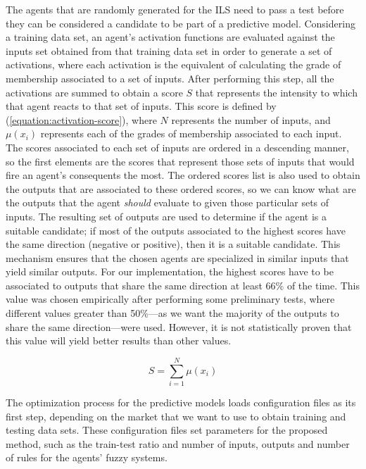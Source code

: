 ﻿\documentclass{ieeeaccess}
\begin{document}
The agents that are randomly generated for the ILS need to
pass a test before they can be considered a candidate to be part of a
predictive model. Considering a training data set, an agent's
activation functions are evaluated against the inputs set obtained
from that training data set in order to generate a set of activations,
where each activation is the equivalent of calculating the grade of
membership associated to a set of inputs. After performing this step,
all the activations are summed to obtain a score $S$ that represents
the intensity to which that agent reacts to that set of inputs. This
score is defined by (\ref{equation:activation-score}), where $N$
represents the number of inputs, and $\mu(x_{i})$ represents each of
the grades of membership associated to each input. The scores
associated to each set of inputs are ordered in a descending manner,
so the first elements are the scores that represent those sets of
inputs that would fire an agent's consequents the most. The ordered
scores list is also used to obtain the outputs that are associated to
these ordered scores, so we can know what are the outputs that the
agent \textit{should} evaluate to given those particular sets of
inputs. The resulting set of outputs are used to determine if the
agent is a suitable candidate; if most of the outputs associated to
the highest scores have the same direction (negative or positive),
then it is a suitable candidate. This mechanism ensures that the
chosen agents are specialized in similar inputs that yield similar
outputs. For our implementation, the highest scores have to be
associated to outputs that share the same direction at least 66\% of
the time. This value was chosen empirically after performing some
preliminary tests, where different values greater than 50\%---as we
want the majority of the outputs to share the same direction---were
used. However, it is not statistically proven that this value will
yield better results than other values.

\begin{equation}
  \label{equation:activation-score}
  S =\sum_{i=1}^{N}{\mu(x_{i})}
\end{equation}

The optimization process for the predictive models loads configuration
files as its first step, depending on the market that we want to use
to obtain training and testing data sets. These configuration files
set parameters for the proposed method, such as the train-test ratio
and number of inputs, outputs and number of rules for the agents'
fuzzy systems.
\end{document}
